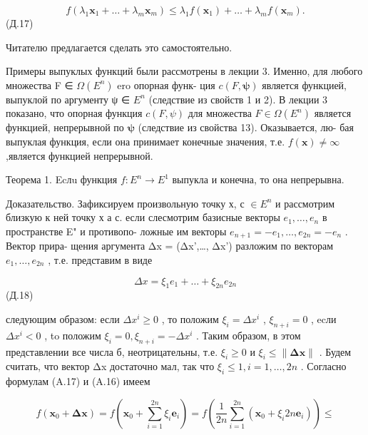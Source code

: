 \documentclass[8pt]{extarticle}
\begin{document}
\[
f\left( {{\lambda }_{1}{\mathbf{x}}_{1} + \ldots  + {\lambda }_{m}{\mathbf{x}}_{m}}\right)  \leq  {\lambda }_{1}f\left( {\mathbf{x}}_{1}\right)  + \ldots  + {\lambda }_{m}f\left( {\mathbf{x}}_{m}\right) .
\]
 (Д.17)

Читателю предлагается сделать это самостоятельно.

Примеры выпуклых функций были рассмотрены в лекции 3. Именно, для любого множества F ∈ \(\Omega \left( {E}^{n}\right)\) ero опорная функ- ция \(c\left( {F,\mathbf{\psi }}\right)\) является функцией, выпуклой по аргументу ψ ∈ \({E}^{n}\) (следствие из свойств 1 и 2). В лекции 3 показано, что опорная функция \(c\left( {F,\psi }\right)\) для множества \(F \in  \Omega \left( {E}^{n}\right)\) является функцией, непрерывной по \(\mathbf{\psi }\) (следствие из свойства 13). Оказывается, лю- бая выпуклая функция, если она принимает конечные значения, т.е. \(f\left( \mathbf{x}\right)  \neq  \infty\) ,является функцией непрерывной.

Теорема 1. Ecлu функция \(f : {E}^{n} \rightarrow  {E}^{1}\) выпукла и конечна, то она непрерывна.

Доказательство. Зафиксируем произвольную точку х, с \(\in  {E}^{n}\) и рассмотрим близкую к ней точку х а с. если слесмотрим базисные векторы \({e}_{1},\ldots ,{e}_{n}\) в пространстве E" и противопо- ложные им векторы \({e}_{n + 1} =  - {e}_{1},\ldots ,{e}_{2n} =  - {e}_{n}\) . Вектор прира- щения аргумента Δx = (Δx',…, Δx’) разложим по векторам \({e}_{1},\ldots ,{e}_{2n}\) , т.е. представим в виде

\[
{\Delta x} = {\xi }_{1}{e}_{1} + \ldots  + {\xi }_{2n}{e}_{2n}
\]
 (Д.18)

следующим образом: если \(\Delta {x}^{i} \geq  0\) , то положим \({\xi }_{i} = \Delta {x}^{i}\) , \({\xi }_{n + i} = 0\) , ecли \(\Delta {x}^{i} < 0\) , to положим \({\xi }_{i} = 0,{\xi }_{n + i} =  - \Delta {x}^{i}\) . Таким образом, в этом представлении все числа б, неотрицательны, т.е. \({\xi }_{i} \geq  0\) и \({\xi }_{i} \leq  \parallel \mathbf{{\Delta x}}\parallel\) . Будем считать, что вектор Δx достаточно мал, так что \({\xi }_{i} \leq  1,i = 1,\ldots ,{2n}\) . Согласно формулам (A.17) и (A.16) имеем

\[
f\left( {{\mathbf{x}}_{0} + \mathbf{\Delta }\mathbf{x}}\right)  = f\left( {{\mathbf{x}}_{0} + \mathop{\sum }\limits_{{i = 1}}^{{2n}}{\xi }_{i}{\mathbf{e}}_{i}}\right)  = f\left( {\frac{1}{2n}\mathop{\sum }\limits_{{i = 1}}^{{2n}}\left( {{\mathbf{x}}_{0} + {\xi }_{i}{2n}{\mathbf{e}}_{i}}\right) }\right)  \leq
\]
\end{document}
